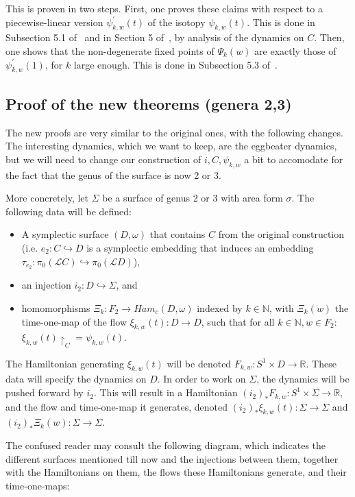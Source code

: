 \documentclass[11pt]{article}
\newcommand{\R}{\mathbb{R}}
\newcommand{\N}{\mathbb{N}}
\begin{document}
            This is proven in two steps. First, one proves these claims with respect to a piecewise-linear version $\psi_{k,w}^\prime(t)$ of the isotopy $\psi_{k,w}(t)$. This is done in Subsection 5.1 of~\cite{10} and in Section 5 of~\cite{PS14}, by analysis of the dynamics on $C$. Then, one shows that the non-degenerate fixed points of $\Psi_k(w)$ are exactly those of $\psi_{k,w}^\prime(1)$, for $k$ large enough. This is done in Subsection 5.3 of~\cite{10}.
    
    \subsection{Proof of the new theorems (genera 2,3)}
    \label{sec:3.2}
        The new proofs are very similar to the original ones, with the following changes. The interesting dynamics, which we want to keep, are the eggbeater dynamics, but we will need to change our construction of $i, C, \psi_{k,w}$ a bit to accomodate for the fact that the genus of the surface is now 2 or 3.
        
        More concretely, let $\Sigma$ be a surface of genus 2 or 3 with area form $\sigma$. The following data will be defined:
        \begin{itemize}
            \item A symplectic surface $(D,\omega)$ that contains $C$ from the original construction (i.e. $e_2: C \hookrightarrow D$ is a symplectic embedding that induces an embedding $\tau_{e_2}: \pi_0(\mathscr{L}C) \hookrightarrow \pi_0(\mathscr{L}D)$),
            \item an injection $i_2: D \hookrightarrow \Sigma$, and 
            \item homomorphisms $\Xi_k: F_2 \to Ham_c(D, \omega)$ indexed by $k \in \N$, with $\Xi_k(w)$ the time-one-map of the flow $\xi_{k,w}(t): D \to D$, such that for all $k \in \N, w \in F_2$: $\xi_{k,w}(t) \restriction_C = \psi_{k,w}(t)$.
        \end{itemize}
        The Hamiltonian generating $\xi_{k,w}(t)$ will be denoted $F_{k,w}: S^1 \times D \to \R$. These data will specify the dynamics on $D$. In order to work on $\Sigma$, the dynamics will be pushed forward by $i_2$. This will result in a Hamiltonian $(i_2)_* F_{k,w}: S^1 \times \Sigma \to \R$, and the flow and time-one-map it generates, denoted $(i_2)_* \xi_{k,w}(t): \Sigma \to \Sigma$ and $(i_2)_* \Xi_k(w): \Sigma \to \Sigma$.
        
        The confused reader may consult the following diagram, which indicates the different surfaces mentioned till now and the injections between them, together with the Hamiltonians on them, the flows these Hamiltonians generate, and their time-one-maps:
        
\end{document}
